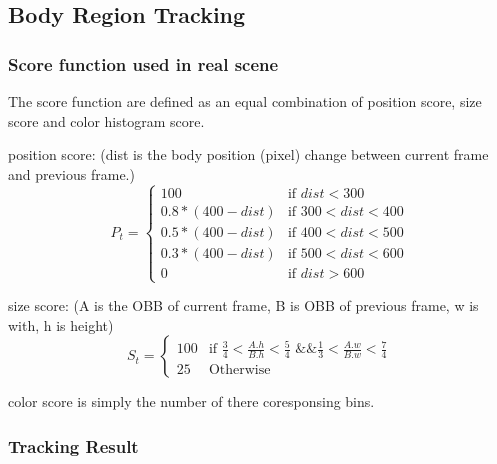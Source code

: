 \documentclass[11pt,twocolumn,letterpaper]{article}
\begin{document}
  \subsection{Body Region Tracking}
\subsubsection{Score function used in real scene}
The score function are defined as an equal combination of position score, size score and color histogram score.
\par
position score: (dist is the body position (pixel) change between current frame and previous frame.)
\begin{equation}
    P_{t}=
   \begin{cases}
   100 &\mbox{if $dist < 300$}\\
   0.8*(400-dist) &\mbox{if $300 < dist < 400$}\\
0.5*(400-dist) &\mbox{if $400 < dist < 500$}\\
0.3*(400-dist) &\mbox{if $500 < dist < 600$}\\
0 &\mbox{if $dist > 600$}
   \end{cases}
  \end{equation}

size score: (A is the OBB of current frame, B is OBB of previous frame, w is with, h is height)
\begin{equation}
    S_{t}=
   \begin{cases}
   100 &\mbox{if $\frac{3}{4} < \frac{A.h}{B.h} < \frac{5}{4} $ \&\& $\frac{1}{3} < \frac{A.w}{B.w} < \frac{7}{4} $}\\
25 &\mbox{Otherwise}
   \end{cases}
  \end{equation}

\par
color score is simply the number of there coresponsing bins.

\subsubsection{Tracking Result}
\end{document}
